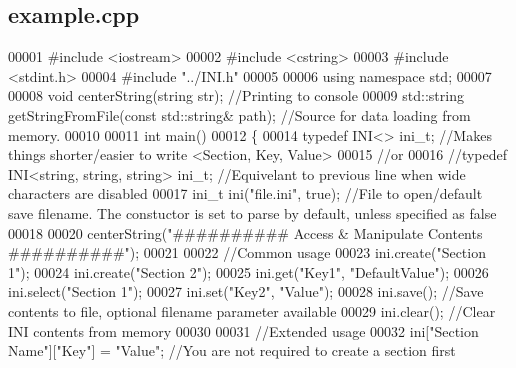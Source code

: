 \subsection{example.\+cpp}
\label{example_8cpp_source}

\begin{DoxyCode}
00001 \textcolor{preprocessor}{#include <iostream>}
00002 \textcolor{preprocessor}{#include <cstring>}
00003 \textcolor{preprocessor}{#include <stdint.h>}
00004 \textcolor{preprocessor}{#include "../INI.h"}
00005 
00006 \textcolor{keyword}{using namespace }std;
00007 
00008 \textcolor{keywordtype}{void} centerString(\textcolor{keywordtype}{string} str); \textcolor{comment}{//Printing to console}
00009 std::string getStringFromFile(\textcolor{keyword}{const} std::string& path); \textcolor{comment}{//Source for data loading from memory.}
00010 
00011 \textcolor{keywordtype}{int} main()
00012 \{
00014    \textcolor{keyword}{typedef} INI<> ini\_t;  \textcolor{comment}{//Makes things shorter/easier to write <Section, Key, Value>}
00015    \textcolor{comment}{//or}
00016    \textcolor{comment}{//typedef INI<string, string, string> ini\_t;  //Equivelant to previous line when wide characters are
       disabled}
00017    ini\_t ini(\textcolor{stringliteral}{"file.ini"}, \textcolor{keyword}{true});  \textcolor{comment}{//File to open/default save filename. The constuctor is set to parse by
       default, unless specified as false}
00018 
00020    centerString(\textcolor{stringliteral}{"########## Access & Manipulate Contents ##########"});
00021 
00022    \textcolor{comment}{//Common usage}
00023    ini.create(\textcolor{stringliteral}{"Section 1"});
00024    ini.create(\textcolor{stringliteral}{"Section 2"});
00025    ini.get(\textcolor{stringliteral}{"Key1"}, \textcolor{stringliteral}{"DefaultValue"});
00026    ini.select(\textcolor{stringliteral}{"Section 1"});
00027    ini.set(\textcolor{stringliteral}{"Key2"}, \textcolor{stringliteral}{"Value"});
00028    ini.save(); \textcolor{comment}{//Save contents to file, optional filename parameter available}
00029    ini.clear(); \textcolor{comment}{//Clear INI contents from memory}
00030 
00031    \textcolor{comment}{//Extended usage}
00032    ini[\textcolor{stringliteral}{"Section Name"}][\textcolor{stringliteral}{"Key"}] = \textcolor{stringliteral}{"Value"};  \textcolor{comment}{//You are not required to create a section first}

\end{DoxyCode}
